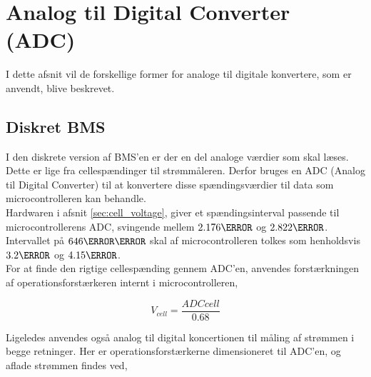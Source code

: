 \section{Analog til Digital Converter (ADC)}\label{afs:ADC}
I dette afsnit vil de forskellige former for analoge til digitale konvertere, som er anvendt, blive beskrevet. 

\subsection{Diskret BMS}
I den diskrete version af BMS'en er der en del analoge værdier som skal læses. Dette er lige fra cellespændinger til strømmåleren. Derfor bruges en ADC (Analog til Digital Converter) til at konvertere disse spændingsværdier til data som microcontrolleren kan behandle.
\\

Hardwaren i afsnit \ref{sec:cell_voltage}, giver et spændingsinterval passende til microcontrollerens ADC, svingende mellem $2.176\volt$ og $2.822\volt$. Intervallet på $646\milli\volt$ skal af microcontrolleren tolkes som henholdsvis $3.2\volt$ og $4.15\volt$.
\\

For at finde den rigtige cellespænding gennem ADC'en, anvendes  forstærkningen af operationsforstærkeren internt i microcontrolleren,

\begin {equation}
V_{cell} =  \frac{ADCcell}{0.68} \label{eq:ADC}
\end {equation}


Ligeledes anvendes også analog til digital koncertionen til måling af strømmen i begge retninger. Her er operationsforstærkerne dimensioneret til ADC'en, og aflade strømmen findes ved,

